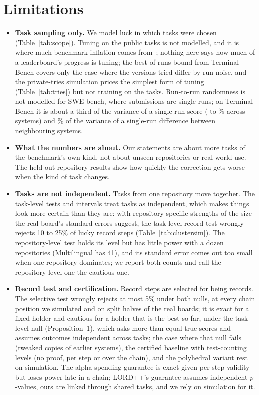 \documentclass[11pt]{article}
\begin{document}
\section{Limitations}\label{sec:limits}
\begin{itemize}
\item \textbf{Task sampling only.} We model luck in which tasks were chosen (Table~\ref{tab:scope}). Tuning on the public tasks is not modelled, and it is where much benchmark inflation comes from~\citep{singh2025illusion,yang2026hidden}; nothing here says how much of a leaderboard's progress is tuning; the best-of-runs bound from Terminal-Bench covers only the case where the versions tried differ by run noise, and the private-tries simulation prices the simplest form of tuning (Table~\ref{tab:tries}) but not training on the tasks. Run-to-run randomness is not modelled for SWE-bench, where submissions are single runs; on Terminal-Bench it is about a third of the variance of a single-run score (\NumTBRunShareSingleMin{} to \NumTBRunShareSingleMax\% across systems) and \NumTBPairRunShareSingle\% of the variance of a single-run difference between neighbouring systems.
\item \textbf{What the numbers are about.} Our statements are about more tasks of the benchmark's own kind, not about unseen repositories or real-world use. The held-out-repository results show how quickly the correction gets worse when the kind of task changes.
\item \textbf{Tasks are not independent.} Tasks from one repository move together. The task-level tests and intervals treat tasks as independent, which makes things look more certain than they are: with repository-specific strengths of the size the real board's standard errors suggest, the task-level record test wrongly rejects 10 to 25\% of lucky record steps (Table~\ref{tab:clustersim}). The repository-level test holds its level but has little power with a dozen repositories (Multilingual has 41), and its standard error comes out too small when one repository dominates; we report both counts and call the repository-level one the cautious one.
\item \textbf{Record test and certification.} Record steps are selected for being records. The selective test wrongly rejects at most 5\% under both nulls, at every chain position we simulated and on split halves of the real boards; it is exact for a fixed holder and cautious for a holder that is the best so far, under the task-level null (Proposition~1), which asks more than equal true scores and assumes outcomes independent across tasks; the case where that null fails (tweaked copies of earlier systems), the certified baseline with test-counting levels (no proof, per step or over the chain), and the polyhedral variant rest on simulation. The alpha-spending guarantee is exact given per-step validity but loses power late in a chain; LORD++'s guarantee assumes independent $p$-values, ours are linked through shared tasks, and we rely on simulation for it.

\end{itemize}
\end{document}

